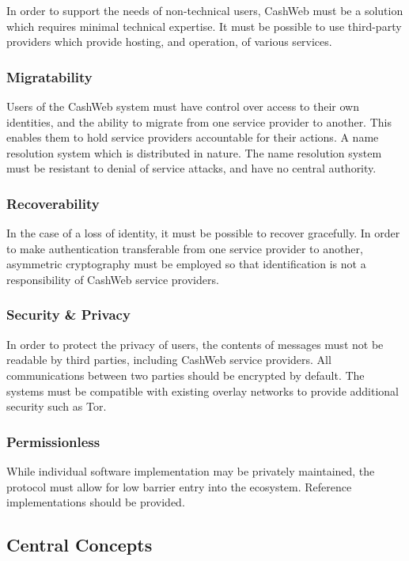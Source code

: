 \documentclass{article}
\begin{document}
In order to support the needs of non-technical users, CashWeb must be a solution which requires minimal technical expertise. It must be possible to use third-party providers which provide hosting, and operation, of various services.

\subsubsection{Migratability}

Users of the CashWeb system must have control over access to their own identities, and the ability to migrate from one service provider to another. This enables them to hold service providers accountable for their actions. A name resolution system which is distributed in nature. The name resolution system must be resistant to denial of service attacks, and have no central authority.

\subsubsection{Recoverability}

In the case of a loss of identity, it must be possible to recover gracefully. In order to make authentication transferable from one service provider to another, asymmetric cryptography must be employed so that identification is not a responsibility of CashWeb service providers.

\subsubsection{Security \& Privacy}

In order to protect the privacy of users, the contents of messages must not be readable by third parties, including CashWeb service providers. All communications between two parties should be encrypted by default. The systems must be compatible with existing overlay networks to provide additional security such as Tor.

\subsubsection{Permissionless}

While individual software implementation may be privately maintained, the protocol must allow for low barrier entry into the ecosystem. Reference implementations should be provided.

\subsection{Central Concepts}
\end{document}
